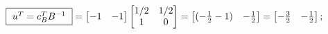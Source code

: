 \documentclass{article}
\begin{document}
\begin{preview}
                \paragraph{}
                \begin{math}
                        \framebox{ $ u^T = c^{T}_{B}B^{-1} $ } = \begin{bmatrix}
                                -1 & -1
                        \end{bmatrix} \begin{bmatrix}
                                1/2 & 1/2 \\
                                1 & 0
                        \end{bmatrix} = \begin{bmatrix}
                                ( -\frac{1}{2} -1 ) & -\frac{1}{2}
                        \end{bmatrix} = \begin{bmatrix}
                                -\frac{3}{2} & -\frac{1}{2}
                        \end{bmatrix};
                \end{math}


\end{preview}
\end{document}
